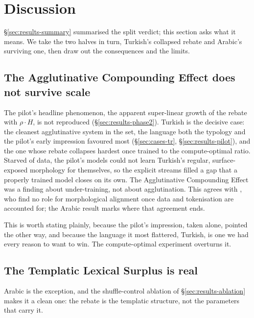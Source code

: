 \section{Discussion}
\label{sec:discussion}

\S\ref{sec:results-summary} summarised the split verdict; this section asks what it means. We take the two halves in turn, Turkish's collapsed rebate and Arabic's surviving one, then draw out the consequences and the limits.

\subsection{The Agglutinative Compounding Effect does not survive scale}
\label{sec:discussion-ace}

The pilot's headline phenomenon, the apparent super-linear growth of the rebate with $\rho \cdot H$, is not reproduced (\S\ref{sec:results-phase2}). Turkish is the decisive case: the cleanest agglutinative system in the set, the language both the typology and the pilot's early impression favoured most (\S\ref{sec:cases-tr}, \S\ref{sec:results-pilot}), and the one whose rebate collapses hardest once trained to the compute-optimal ratio. Starved of data, the pilot's models could not learn Turkish's regular, surface-exposed morphology for themselves, so the explicit streams filled a gap that a properly trained model closes on its own. The Agglutinative Compounding Effect was a finding about under-training, not about agglutination. This agrees with \citet{arnett2025}, who find no role for morphological alignment once data and tokenisation are accounted for; the Arabic result marks where that agreement ends.

This is worth stating plainly, because the pilot's impression, taken alone, pointed the other way, and because the language it most flattered, Turkish, is one we had every reason to want to win. The compute-optimal experiment overturns it.

\subsection{The Templatic Lexical Surplus is real}
\label{sec:discussion-tls}

Arabic is the exception, and the shuffle-control ablation of \S\ref{sec:results-ablation} makes it a clean one: the rebate is the templatic structure, not the parameters that carry it.

